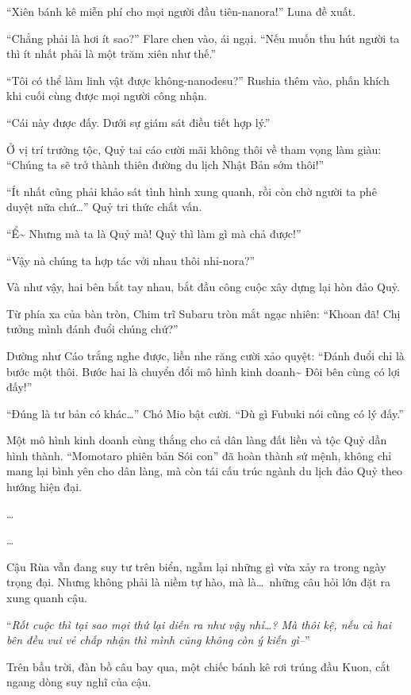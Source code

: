\documentclass[../main.tex]{subfiles}
\begin{document}
``Xiên bánh kê miễn phí cho mọi người đầu tiên-nanora!'' Luna đề xuất.

``Chẳng phải là hơi ít sao?'' Flare chen vào, ái ngại. ``Nếu muốn thu hút người ta thì ít nhất phải là một trăm xiên như thế.''

``Tôi có thể làm linh vật được không-nanodesu?'' Rushia thêm vào, phấn khích khi cuối cùng được mọi người công nhận.

``Cái này được đấy. Dưới sự giám sát điều tiết hợp lý.''

Ở vị trí trưởng tộc, Quỷ tai cáo cười mãi không thôi về tham vọng làm giàu: ``Chúng ta sẽ trở thành thiên đường du lịch Nhật Bản sớm thôi!''

``Ít nhất cũng phải khảo sát tình hình xung quanh, rồi còn chờ người ta phê duyệt nữa chứ\dots'' Quỷ tri thức chất vấn.

``Ể\~{} Nhưng mà ta là Quỷ mà! Quỷ thì làm gì mà chả được!''

``Vậy nà chúng ta hợp tác với nhau thôi nhỉ-nora?''

Và như vậy, hai bên bắt tay nhau, bắt đầu công cuộc xây dựng lại hòn đảo Quỷ.

Từ phía xa của bàn tròn, Chim trĩ Subaru tròn mắt ngạc nhiên: ``Khoan đã! Chị tưởng mình đánh đuổi chúng chứ?''

Dường như Cáo trắng nghe được, liền nhe răng cười xảo quyệt: ``Đánh đuổi chỉ là bước một thôi. Bước hai là chuyển đổi mô hình kinh doanh\~{} Đôi bên cùng có lợi đấy!''

``Đúng là tư bản có khác\dots'' Chó Mio bật cười. ``Dù gì Fubuki nói cũng có lý đấy.''

Một mô hình kinh doanh cùng thắng cho cả dân làng đất liền và tộc Quỷ dần hình thành. ``Momotaro phiên bản Sói con'' đã hoàn thành sứ mệnh, không chỉ mang lại bình yên cho dân làng, mà còn tái cấu trúc ngành du lịch đảo Quỷ theo hướng hiện đại.

\dots

\dots

Cậu Rùa vẫn đang suy tư trên biển, ngẫm lại những gì vừa xảy ra trong ngày trọng đại. Nhưng không phải là niềm tự hào, mà là\dots\ những câu hỏi lớn đặt ra xung quanh cậu.

``\textit{Rốt cuộc thì tại sao mọi thứ lại diễn ra như vậy nhỉ\dots? Mà thôi kệ, nếu cả hai bên đều vui vẻ chấp nhận thì mình cũng không còn ý kiến gì--}''

Trên bầu trời, đàn bồ câu bay qua, một chiếc bánh kê rơi trúng đầu Kuon, cắt ngang dòng suy nghĩ của cậu.
\end{document}
